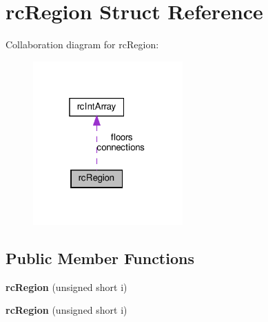 \hypertarget{structrcRegion}{}\section{rc\+Region Struct Reference}
\label{structrcRegion}


Collaboration diagram for rc\+Region\+:
\nopagebreak
\begin{figure}[H]
\begin{center}
\leavevmode
\includegraphics[width=163pt]{structrcRegion__coll__graph}
\end{center}
\end{figure}
\subsection*{Public Member Functions}
\begin{DoxyCompactItemize}
\item 
\mbox{\label{structrcRegion_ac7b24c63bcdaeee325cdc61b4f12f39c}} 
{\bfseries rc\+Region} (unsigned short i)
\item 
\mbox{\label{structrcRegion_ac7b24c63bcdaeee325cdc61b4f12f39c}} 
{\bfseries rc\+Region} (unsigned short i)
\end{DoxyCompactItemize}
